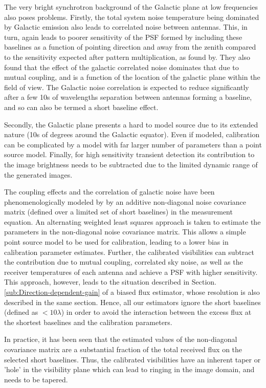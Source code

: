 \documentclass{aa}
\begin{document}
The very bright synchrotron background of the Galactic plane at low
frequencies also poses problems. Firstly, the total system noise temperature
being dominated by Galactic emission also leads to correlated noise
between antennas. This, in turn, again leads to poorer sensitivity
of the PSF formed by including these baselines as a function of pointing
direction and away from the zenith compared to the sensitivity expected
after pattern multiplication, as found by\cite{ellingson2011sensitivity}.
They also found that the effect of the galactic correlated noise dominates
that due to mutual coupling, and is a function of the location of
the galactic plane within the field of view. The Galactic noise correlation
is expected to reduce significantly after a few 10s of wavelengths
separation between antennas forming a baseline, and so can also be
termed a short baseline effect.

Secondly, the Galactic plane presents a hard to model source due to
its extended nature (10s of degrees around the Galactic equator).
Even if modeled, calibration can be complicated by a model with far
larger number of parameters than a point source model. Finally, for
high sensitivity transient detection its contribution to the image
brightness needs to be subtracted due to the limited dynamic range
of the generated images.

The coupling effects and the correlation of galactic noise have been
phenomenologically modeled by \cite{wijnholds2010self} by an additive
non-diagonal noise covariance matrix (defined over a limited set of
short baselines) in the measurement equation. An alternating weighted
least squares approach is taken to estimate the parameters in the
non-diagonal noise covariance matrix. This allows a simple point source
model to be used for calibration, leading to a lower bias in calibration
parameter estimates. Further, the calibrated visibilities can subtract
the contribution due to mutual coupling, correlated sky noise, as
well as the receiver temperatures of each antenna and achieve a PSF
with higher sensitivity. This approach, however, leads to the situation
described in Section. \ref{sub:Direction-dependent-gain} of a biased
flux estimator, whose resolution is also described in the same section.
Hence, all our estimators ignore the short baselines (defined as $<10\lambda$)
in order to avoid the interaction between the excess flux at the shortest
baselines and the calibration parameters.

In practice, it has been seen that the estimated values of the non-diagonal
covariance matrix are a substantial fraction of the total received
flux on the selected short baselines. Thus, the calibrated visibilities
have an inherent taper or 'hole' in the visibility plane which can
lead to ringing in the image domain, and needs to be tapered. 
\end{document}
